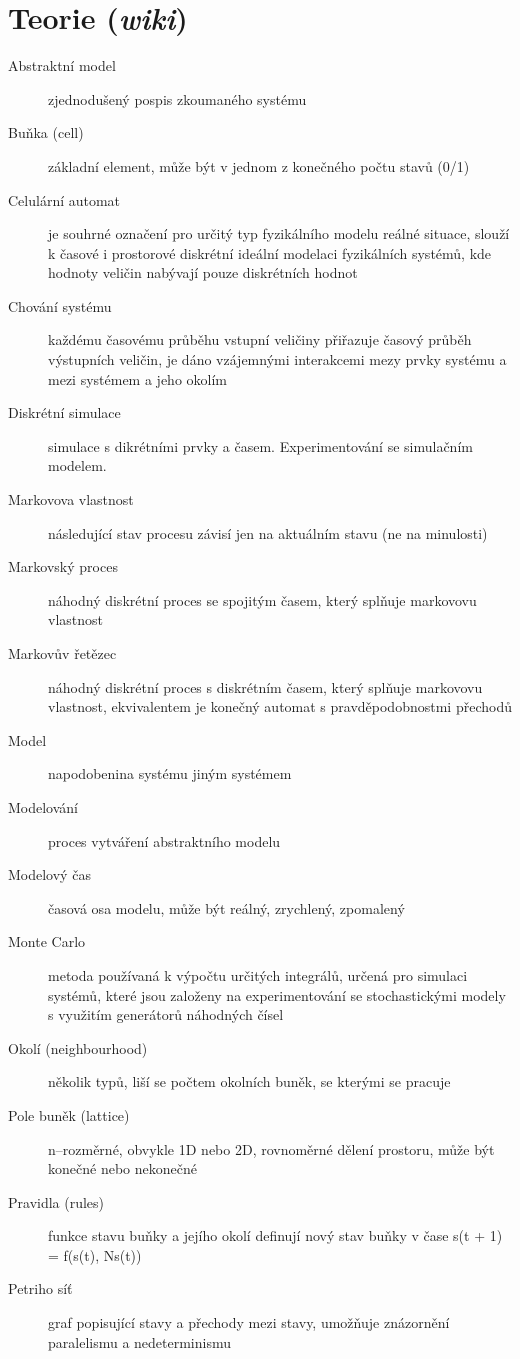 \documentclass[11pt]{article} %
\begin{document}
\section{Teorie (\textit{wiki})}
\begin{description}
\item[Abstraktní model] zjednodušený pospis zkoumaného systému
\item[Buňka (cell)] základní element, může být v jednom z konečného počtu stavů (0/1)
\item[Celulární automat] je souhrné označení pro určitý typ fyzikálního modelu reálné situace, slouží k časové i prostorové diskrétní ideální modelaci fyzikálních systémů, kde hodnoty veličin nabývají pouze diskrétních hodnot
\item[Chování systému] každému časovému průběhu vstupní veličiny přiřazuje časový průběh výstupních veličin, je dáno vzájemnými interakcemi mezy prvky systému a mezi systémem a jeho okolím
\item[Diskrétní simulace] simulace s dikrétními prvky a časem. Experimentování se simulačním modelem.
\item[Markovova vlastnost] následující stav procesu závisí jen na aktuálním stavu (ne na minulosti)
\item[Markovský proces] náhodný diskrétní proces se spojitým časem, který splňuje markovovu vlastnost
\item[Markovův řetězec] náhodný diskrétní proces s diskrétním časem, který splňuje markovovu vlastnost, ekvivalentem je konečný automat s pravděpodobnostmi přechodů
\item[Model] napodobenina systému jiným systémem
\item[Modelování] proces vytváření abstraktního modelu
\item[Modelový čas] časová osa modelu, může být reálný, zrychlený, zpomalený
\item[Monte Carlo] metoda používaná k výpočtu určitých integrálů, určená pro simulaci systémů, které jsou založeny na experimentování se stochastickými modely s využitím generátorů náhodných čísel
\item[Okolí (neighbourhood)] několik typů, liší se počtem okolních buněk, se kterými se pracuje
\item[Pole buněk (lattice)] n--rozměrné, obvykle 1D nebo 2D, rovnoměrné dělení prostoru, může být konečné nebo nekonečné
\item[Pravidla (rules)] funkce stavu buňky a jejího okolí definují nový stav buňky v čase s(t + 1) = f(s(t), Ns(t))
\item[Petriho síť] graf popisující stavy a přechody mezi stavy, umožňuje znázornění paralelismu a nedeterminismu

\end{description}
\end{document}
